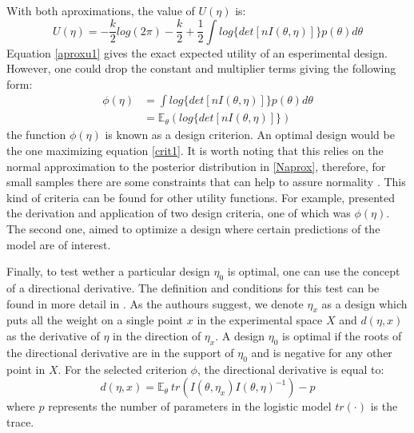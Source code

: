 \documentclass[preprint,review,12pt]{elsarticle}
\begin{document}
With both aproximations, the value of $U(\eta)$ is:
\begin{equation}
U(\eta)=-\frac{k}{2}log(2\pi)-\frac{k}{2}+\frac{1}{2} \int log \{det[nI(\theta,\eta)]\} p(\theta) d\theta
\label{aproxu1}
\end{equation}
Equation \ref{aproxu1} gives the exact expected utility of an esperimental design. However, one could drop the constant and multiplier terms giving the following form:
\begin{align}
\phi(\eta) & = \int log \{det[nI(\theta,\eta)]\} p(\theta) d\theta \\
           & = \mathbb{E}_\theta \left( log\{det[nI(\theta,\eta)]\} \right)
\label{crit1}
\end{align}
the function $\phi(\eta)$ is known as a design criterion. An optimal design would be the one maximizing equation \ref{crit1}. It is worth noting that this relies on the normal approximation to the posterior distribution in \ref{Naprox}, therefore, for small samples there are some constraints that can help to assure normality \citep[see][]{CLCH2002}. This kind of criteria can be found for other utility functions. For example, \citet{chalar1989} presented the derivation and application of two design criteria, one of which was $\phi(\eta)$. The second one, aimed to optimize a design where certain predictions of the model are of interest.

Finally, to test wether a particular design $\eta_0$ is optimal, one can use the concept of a directional derivative. The definition and conditions for this test can be found in more detail in \citet{chalar1989}. As the authours suggest, we denote $\eta_x$ as a design which puts all the weight on a single point $x$ in the experimental space $X$ and $d(\eta,x)$ as the derivative of $\eta$ in the direction of $\eta_x$. A design $\eta_0$ is optimal if the roots of the directional derivative are in the support of $\eta_0$ and is negative for any other point in $X$. For the selected criterion $\phi$, the directional derivative is equal to:
\begin{equation}
d(\eta,x)=\mathbb{E}_\theta\ tr \left( I(\theta,\eta_x) I(\theta,\eta)^{-1}\right)-p
\end{equation}
where $p$ represents the number of parameters in the logistic model $tr(\cdot)$ is the trace.




% 
\end{document}

